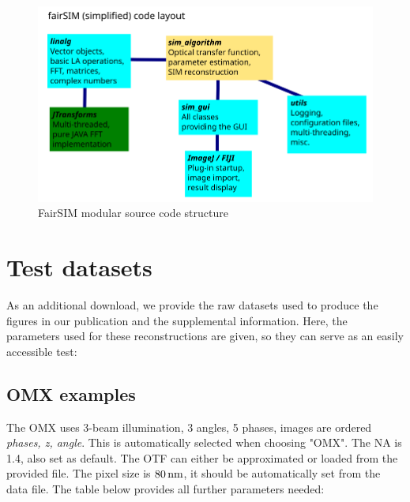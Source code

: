 \documentclass[twoside=false,
           twocolumn=false,
           a4paper,DIV=15,
           10pt]{scrartcl}
\begin{document}
\begin{figure}[H]
\begin{center}
\includegraphics[width=.7\textwidth]{../figures/SketchCodeDiagramm}
\end{center}
\caption{FairSIM modular source code structure}
\label{sup-fig-code}
\end{figure}




\clearpage

\section{Test datasets}

As an additional download, we provide the raw
datasets used to produce the figures in our
publication and the supplemental information.
Here, the parameters used for these reconstructions
are given, so they can serve as an easily accessible
test:

\subsection{OMX examples}

The OMX uses 3-beam illumination, 3 angles, 5 phases,
images are ordered \emph{phases, z, angle}. This is
automatically selected when choosing "OMX". The NA is 1.4,
also set as default. The OTF can either be approximated
or loaded from the provided file. 
The pixel size is $\unit[80]{nm}$,
it should be automatically set from the data file.
The table below provides all further
parameters needed:
\vspace{1em}
\end{document}

